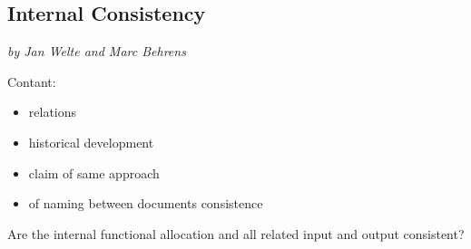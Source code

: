 \subsection{Internal Consistency}

\textit{by Jan Welte and Marc Behrens}



Contant:
\begin{itemize}
\item relations
\item historical development
\item claim of same approach
\item of naming between documents consistence 
\end{itemize}

Are the internal functional allocation and all related input and output consistent?
